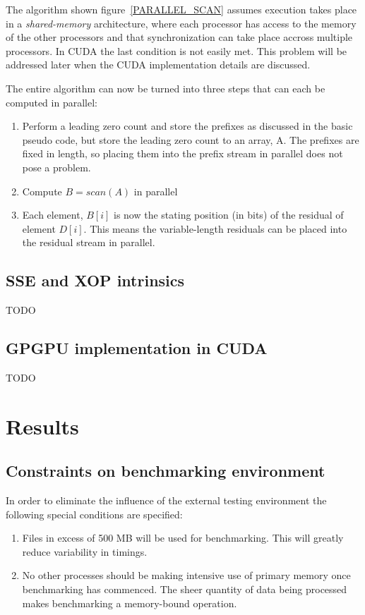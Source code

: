  The algorithm shown figure~\ref{PARALLEL_SCAN} assumes execution takes place in a \textit{shared-memory} architecture, where each processor has access to the memory of the other processors and that synchronization
 can take place accross multiple processors. In CUDA the last condition is not easily met. This problem will be addressed later when the CUDA implementation details are discussed.
 
 The entire algorithm can now be turned into three steps that can each be computed in parallel:
 \begin{enumerate}
  \item Perform a leading zero count and store the prefixes as discussed in the basic pseudo code, but store the leading zero count to an array, A. The prefixes are fixed in length, so placing them
  into the prefix stream in parallel does not pose a problem.
  \item Compute $B = scan(A)$ in parallel
  \item Each element, $B[i]$ is now the stating position (in bits) of the residual of element $D[i]$. This means the variable-length residuals can be placed into the residual stream in parallel.
 \end{enumerate}


 \subsection{SSE and XOP intrinsics} 
  {\color{red}TODO} 
 \subsection{GPGPU implementation in CUDA}
  {\color{red}TODO}
\section{Results}
\subsection{Constraints on benchmarking environment}
In order to eliminate the influence of the external testing environment the following special conditions are specified:
\begin{enumerate}
 \item Files in excess of 500 MB will be used for benchmarking. This will greatly reduce variability in timings.
 \item No other processes should be making intensive use of primary memory once benchmarking has commenced. The sheer quantity of data being processed makes benchmarking a memory-bound operation.
\end{enumerate}
